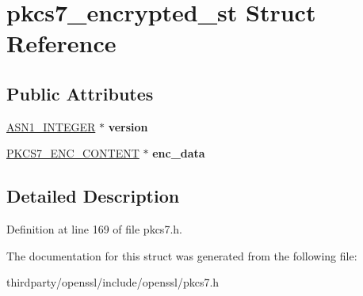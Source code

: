 \hypertarget{structpkcs7__encrypted__st}{}\section{pkcs7\+\_\+encrypted\+\_\+st Struct Reference}
\label{structpkcs7__encrypted__st}
\subsection*{Public Attributes}
\begin{DoxyCompactItemize}
\item 
\mbox{\label{structpkcs7__encrypted__st_a5c44f8bfad75a8a28e7690ca983f50ae}} 
\hyperlink{structasn1__string__st}{A\+S\+N1\+\_\+\+I\+N\+T\+E\+G\+ER} $\ast$ {\bfseries version}
\item 
\mbox{\label{structpkcs7__encrypted__st_ae9cf2da80ef23d3b5ae157898ff071a4}} 
\hyperlink{structpkcs7__enc__content__st}{P\+K\+C\+S7\+\_\+\+E\+N\+C\+\_\+\+C\+O\+N\+T\+E\+NT} $\ast$ {\bfseries enc\+\_\+data}
\end{DoxyCompactItemize}


\subsection{Detailed Description}


Definition at line 169 of file pkcs7.\+h.



The documentation for this struct was generated from the following file\+:\begin{DoxyCompactItemize}
\item 
thirdparty/openssl/include/openssl/pkcs7.\+h\end{DoxyCompactItemize}

